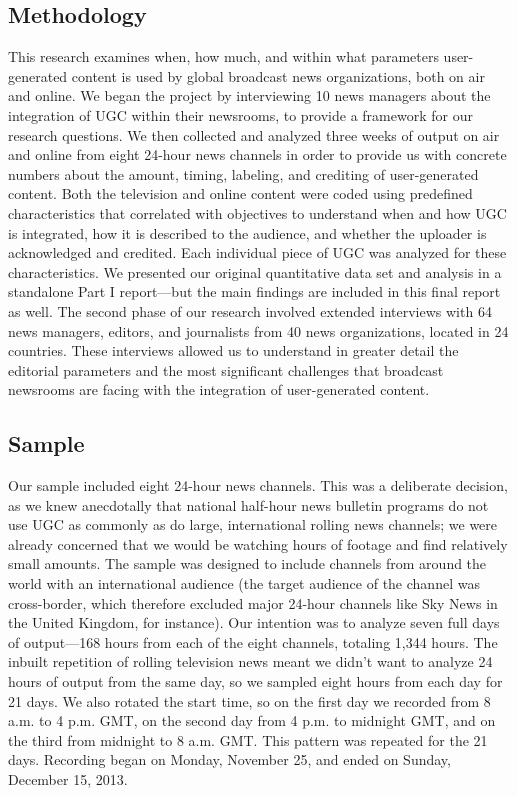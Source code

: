 \begin{enumerate}
\chapter{Methodology}
This research examines when, how much, and within what parameters
user-generated content is used by global broadcast news organizations,
both on air and online. We began the project by interviewing 10 news managers
about the integration of UGC within their newsrooms, to provide
a framework for our research questions. We then collected and analyzed
three weeks of output on air and online from eight 24-hour news channels
in order to provide us with concrete numbers about the amount, timing,
labeling, and crediting of user-generated content. Both the television and
online content were coded using predefined characteristics that correlated
with objectives to understand when and how UGC is integrated, how it is
described to the audience, and whether the uploader is acknowledged and
credited. Each individual piece of UGC was analyzed for these characteristics.
We presented our original quantitative data set and analysis in a standalone
Part I report—but the main findings are included in this final report
as well.
The second phase of our research involved extended interviews with 64 news
managers, editors, and journalists from 40 news organizations, located in
24 countries. These interviews allowed us to understand in greater detail
the editorial parameters and the most significant challenges that broadcast
newsrooms are facing with the integration of user-generated content.

\section{Sample}
Our sample included eight 24-hour news channels. This was a deliberate
decision, as we knew anecdotally that national half-hour news bulletin programs
do not use UGC as commonly as do large, international rolling news
channels; we were already concerned that we would be watching hours
of footage and find relatively small amounts. The sample was designed to
include channels from around the world with an international audience (the
target audience of the channel was cross-border, which therefore excluded
major 24-hour channels like Sky News in the United Kingdom, for instance).
Our intention was to analyze seven full days of output—168 hours from
each of the eight channels, totaling 1,344 hours.
The inbuilt repetition of rolling television news meant we didn't want to
analyze 24 hours of output from the same day, so we sampled eight hours
from each day for 21 days. We also rotated the start time, so on the first day
we recorded from 8 a.m. to 4 p.m. GMT, on the second day from 4 p.m. to
midnight GMT, and on the third from midnight to 8 a.m. GMT. This pattern
was repeated for the 21 days. Recording began on Monday, November
25, and ended on Sunday, December 15, 2013.



\end{enumerate}
